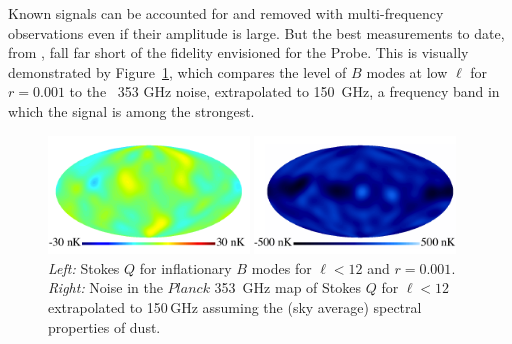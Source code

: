 Known signals can be accounted for and removed with multi-frequency observations even if their amplitude is large. 
But the best measurements to date, from \planck , fall far short of the fidelity envisioned for the Probe. This is visually demonstrated by Figure~\ref{fig:Qrp001}, which 
compares the level of $B$ modes at low $\ell$ for $r = 0.001$ to the \planck\ 353 GHz noise, 
extrapolated to 150~GHz, a frequency band in which the signal is among the strongest. 
\begin{figure}[ht!]
\hspace{.05in}
\parbox{2.in}{\centerline {
\includegraphics[width=2.1in]{Figures/P15_2_12_rp001.pdf} } }
\parbox{2.1in}{\centerline { 
\includegraphics[width=2.1in]{Figures/P353_N_2_12.pdf} } }
\hspace{0.in}
\parbox{2.2in} { 
\caption{ \footnotesize \setlength{\baselineskip}{0.95\baselineskip}
{\it Left:} Stokes $Q$ for inflationary $B$ modes for $\ell<12$ and $r=0.001$. 
 {\it Right:} Noise in the $Planck$ 353~GHz map of Stokes $Q$ for $\ell<12$ 
 extrapolated to 150\,GHz assuming the (sky average) spectral properties of dust. 
\label{fig:Qrp001}  }  }
\vspace{-0.05in}
\end{figure}


